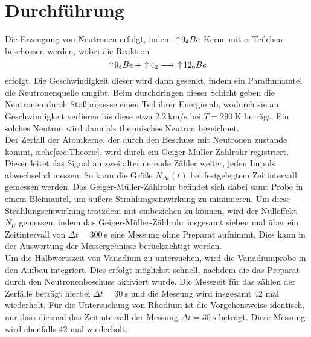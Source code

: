 \section{Durchführung}
\label{sec:Durchführung}

Die Erzeugung von Neutronen erfolgt, indem $\ce^{9}_{4}Be$-Kerne mit $\alpha$-Teilchen beschossen werden, 
wobei die Reaktion 
\begin{equation}
    \ce^{9}_{4}Be + \ce^{4}_{2} \longrightarrow \ce^{12}_{6}Be
\end{equation}
erfolgt. Die Geschwindigkeit dieser wird dann gesenkt, indem ein Paraffinmantel die Neutronenquelle umgibt. Beim durchdringen 
dieser Schicht geben die Neutronen durch Stoßprozesse einen Teil ihrer Energie ab, wodurch sie an Geschwindigkeit verlieren bis 
diese etwa $\SI{2.2}{\kilo\metre\per\s} $ bei $T=\SI{290}{\kelvin} $ beträgt. Ein solches Neutron wird dann als thermisches 
Neutron bezeichnet. 
\\
Der Zerfall der Atomkerne, der durch den Beschuss mit Neutronen zustande kommt, siehe\ref{sec:Theorie}, wird durch ein 
Geiger-Müller-Zählrohr registriert. Dieser leitet das Signal an zwei alternierende Zähler weiter, jeden Impuls abwechselnd messen.
So kann die Größe $N_{\Delta t}(t) $ bei festgelegtem Zeitintervall gemessen werden. Das Geiger-Müller-Zählrohr befindet sich dabei 
samt Probe in einem Bleimantel, um äußere Strahlungseinwirkung zu minimieren. Um diese Strahlungseinwirkung trotzdem mit 
einbeziehen zu können, wird der Nulleffekt $N_U$ gemessen, indem das Geiger-Müller-Zählrohr insgesamt sieben mal über ein 
Zeitintervall von $\Delta t =\SI{300}{\s} $ eine Messung ohne Preparat aufnimmt. Dies kann in der Auswertung der Messergebnisse 
berücksichtigt werden.
\\
Um die Halbwertszeit von Vanadium zu untersuchen, wird die Vanadiumprobe in den Aufbau integriert. Dies erfolgt möglichst schnell,
nachdem die das Preparat durch den Neutronenbeschuss aktiviert wurde. Die Messzeit für das zählen der Zerfälle beträgt hierbei 
$\Delta t= \SI{30}{\s} $ und die Messung wird insgesamt 42 mal wiederholt. Für die Untersuchung von Rhodium ist die 
Vorgehensweise identisch, nur dass diesmal das Zeitintervall der Messung $\Delta t= \SI{30}{\s} $ beträgt. Diese Messung wird 
ebenfalls 42 mal wiederholt. 